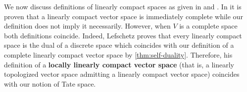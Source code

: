\begin{remark}\label{rem:lef-vs-beilinson}
	We now discuss definitions of linearly compact spaces as given in \cite{Lefschetz-Alg-Top} and \cite{Chiral}. In \cite{Lefschetz-Alg-Top} it is proven that a linearly compact vector space is immediately complete while our definition does not imply it necessarily. However, when $V$ is a complete space both definitions coincide. Indeed, Lefschetz proves that every linearly compact space is the dual of a discrete space which coincides with our definition of a complete linearly compact vector space by \cref{thm:self-duality}. Therefore, his definition of a \textbf{locally linearly compact vector space} (that is, a linearly topologized vector space admitting a linearly compact vector space) coincides with our notion of Tate space.
\end{remark}
